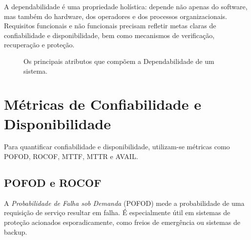 \documentclass[12pt,a4paper]{report}
\begin{document}
A dependabilidade é uma propriedade holística: depende não apenas do
software, mas também do hardware, dos operadores e dos processos
organizacionais. Requisitos funcionais e não funcionais precisam refletir
metas claras de confiabilidade e disponibilidade, bem como mecanismos de
verificação, recuperação e proteção.

\begin{figure}[h]
    \centering
    \caption{Os principais atributos que compõem a Dependabilidade de um sistema.}
\end{figure}


\section{Métricas de Confiabilidade e Disponibilidade}

Para quantificar confiabilidade e disponibilidade, utilizam-se métricas como
POFOD, ROCOF, MTTF, MTTR e AVAIL.

\subsection{POFOD e ROCOF}

A \emph{Probabilidade de Falha sob Demanda} (POFOD) mede a probabilidade de
uma requisição de serviço resultar em falha. É especialmente útil em
sistemas de proteção acionados esporadicamente, como freios de emergência ou
sistemas de backup.
\end{document}
